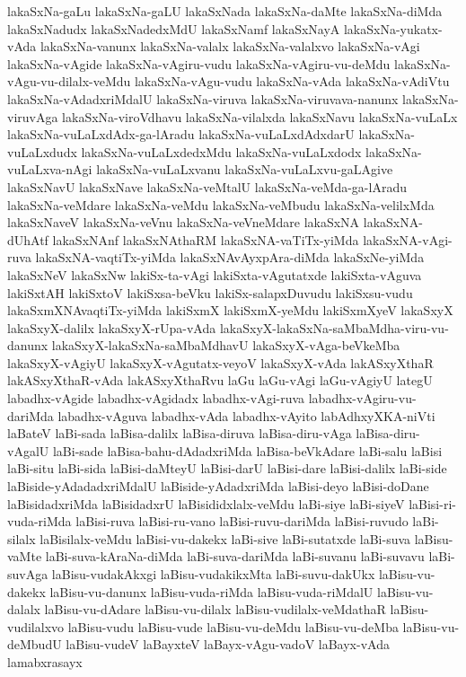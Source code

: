 {lakaSxNa-gaLu
lakaSxNa-gaLU
lakaSxNada
lakaSxNa-daMte
lakaSxNa-diMda
lakaSxNadudx
lakaSxNadedxMdU
lakaSxNamf
lakaSxNayA
lakaSxNa-yukatx-vAda
lakaSxNa-vanunx
lakaSxNa-valalx
lakaSxNa-valalxvo
lakaSxNa-vAgi
lakaSxNa-vAgide
lakaSxNa-vAgiru-vudu
lakaSxNa-vAgiru-vu-deMdu
lakaSxNa-vAgu-vu-dilalx-veMdu
lakaSxNa-vAgu-vudu
lakaSxNa-vAda
lakaSxNa-vAdiVtu
lakaSxNa-vAdadxriMdalU
lakaSxNa-viruva
lakaSxNa-viruvava-nanunx
lakaSxNa-viruvAga
lakaSxNa-viroVdhavu
lakaSxNa-vilalxda
lakaSxNavu
lakaSxNa-vuLaLx
lakaSxNa-vuLaLxdAdx-ga-lAradu
lakaSxNa-vuLaLxdAdxdarU
lakaSxNa-vuLaLxdudx
lakaSxNa-vuLaLxdedxMdu
lakaSxNa-vuLaLxdodx
lakaSxNa-vuLaLxva-nAgi
lakaSxNa-vuLaLxvanu
lakaSxNa-vuLaLxvu-gaLAgive
lakaSxNavU
lakaSxNave
lakaSxNa-veMtalU
lakaSxNa-veMda-ga-lAradu
lakaSxNa-veMdare
lakaSxNa-veMdu
lakaSxNa-veMbudu
lakaSxNa-velilxMda
lakaSxNaveV
lakaSxNa-veVnu
lakaSxNa-veVneMdare
lakaSxNA
lakaSxNA-dUhAtf
lakaSxNAnf
lakaSxNAthaRM
lakaSxNA-vaTiTx-yiMda
lakaSxNA-vAgi-ruva
lakaSxNA-vaqtiTx-yiMda
lakaSxNAvAyxpAra-diMda
lakaSxNe-yiMda
lakaSxNeV
lakaSxNw
lakiSx-ta-vAgi
lakiSxta-vAgutatxde
lakiSxta-vAguva
lakiSxtAH
lakiSxtoV
lakiSxsa-beVku
lakiSx-salapxDuvudu
lakiSxsu-vudu
lakaSxmXNAvaqtiTx-yiMda
lakiSxmX
lakiSxmX-yeMdu
lakiSxmXyeV
lakaSxyX
lakaSxyX-dalilx
lakaSxyX-rUpa-vAda
lakaSxyX-lakaSxNa-saMbaMdha-viru-vu-danunx
lakaSxyX-lakaSxNa-saMbaMdhavU
lakaSxyX-vAga-beVkeMba
lakaSxyX-vAgiyU
lakaSxyX-vAgutatx-veyoV
lakaSxyX-vAda
lakASxyXthaR
lakASxyXthaR-vAda
lakASxyXthaRvu
laGu
laGu-vAgi
laGu-vAgiyU
lategU
labadhx-vAgide
labadhx-vAgidadx
labadhx-vAgi-ruva
labadhx-vAgiru-vu-dariMda
labadhx-vAguva
labadhx-vAda
labadhx-vAyito
labAdhxyXKA-niVti
laBateV
laBi-sada
laBisa-dalilx
laBisa-diruva
laBisa-diru-vAga
laBisa-diru-vAgalU
laBi-sade
laBisa-bahu-dAdadxriMda
laBisa-beVkAdare
laBi-salu
laBisi
laBi-situ
laBi-sida
laBisi-daMteyU
laBisi-darU
laBisi-dare
laBisi-dalilx
laBi-side
laBiside-yAdadadxriMdalU
laBiside-yAdadxriMda
laBisi-deyo
laBisi-doDane
laBisidadxriMda
laBisidadxrU
laBisididxlalx-veMdu
laBi-siye
laBi-siyeV
laBisi-ri-vuda-riMda
laBisi-ruva
laBisi-ru-vano
laBisi-ruvu-dariMda
laBisi-ruvudo
laBi-silalx
laBisilalx-veMdu
laBisi-vu-dakekx
laBi-sive
laBi-sutatxde
laBi-suva
laBisu-vaMte
laBi-suva-kAraNa-diMda
laBi-suva-dariMda
laBi-suvanu
laBi-suvavu
laBi-suvAga
laBisu-vudakAkxgi
laBisu-vudakikxMta
laBi-suvu-dakUkx
laBisu-vu-dakekx
laBisu-vu-danunx
laBisu-vuda-riMda
laBisu-vuda-riMdalU
laBisu-vu-dalalx
laBisu-vu-dAdare
laBisu-vu-dilalx
laBisu-vudilalx-veMdathaR
laBisu-vudilalxvo
laBisu-vudu
laBisu-vude
laBisu-vu-deMdu
laBisu-vu-deMba
laBisu-vu-deMbudU
laBisu-vudeV
laBayxteV
laBayx-vAgu-vadoV
laBayx-vAda
lamabxrasayx
}
